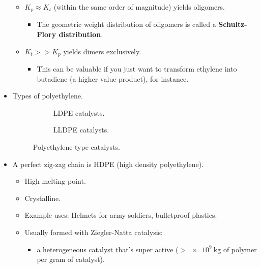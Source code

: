 \documentclass[../notes.tex]{subfiles}
\begin{document}
\begin{itemize}
\begin{itemize}
        \item $K_p\approx K_t$ (within the same order of magnitude) yields oligomers.
        \begin{itemize}
            \item The geometric weight distribution of oligomers is called a \textbf{Schultz-Flory distribution}.
        \end{itemize}
        \item $K_t>>K_p$ yields dimers exclusively.
        \begin{itemize}
            \item This can be valuable if you just want to transform ethylene into butadiene (a higher value product), for instance.
        \end{itemize}
    \end{itemize}
    \item Types of polyethylene.
    \begin{figure}[h!]
        \centering
        \begin{subfigure}[b]{0.3\linewidth}
            \centering
            \caption{LDPE catalysts.}
            \label{fig:catalysts-polyethylenea}
        \end{subfigure}
        \begin{subfigure}[b]{0.3\linewidth}
            \centering
            \caption{LLDPE catalysts.}
            \label{fig:catalysts-polyethyleneb}
        \end{subfigure}
        \caption{Polyethylene-type catalysts.}
        \label{fig:catalysts-polyethylene}
    \end{figure}
    \item A perfect zig-zag chain is HDPE (high density polyethylene).
    \begin{itemize}
        \item High melting point.
        \item Crystalline.
        \item Example uses: Helmets for army soldiers, bulletproof plastics.
        \item Usually formed with Ziegler-Natta catalysis:
        \begin{itemize}
            \item {} a heterogeneous catalyst that's super active ($>\SI{e9}{\kilo\gram}$ of polymer per gram of catalyst).

\end{itemize}
\end{itemize}
\end{itemize}
\end{document}
